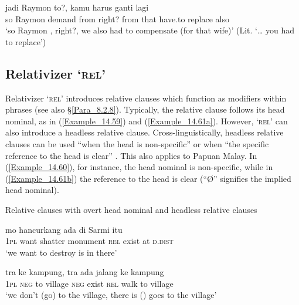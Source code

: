 \ea
\label{Example_14.58}
\gll jadi  Raymon        to?,       kamu  harus  ganti  lagi\\  
so  Raymon  demand  from    right?  from   that    have.to  replace  also\\
 ‘so Raymon , right?,  we also had to compensate (for that wife)’ (Lit. ‘{\ldots}  you had to replace’) \textstyleExampleSource{[081006-024-CvEx.0019]}
\z


\subsection{Relativizer  ‘\textsc{rel}’}
\label{Para_14.3.2}
Relativizer  ‘\textsc{rel}’ introduces relative clauses which function as modifiers within  phrases (see also §\ref{Para_8.2.8}). Typically, the relative clause follows its head nominal, as in (\ref{Example_14.59}) and (\ref{Example_14.61a}). However,  ‘\textsc{rel}’ can also introduce a headless relative clause. Cross-linguistically, headless relative clauses can be used “when the head  is non-specific” or when “the specific reference to the head is clear” \citep[295]{Payne.1997}. This also applies to Papuan Malay. In (\ref{Example_14.60}), for instance, the head nominal is non-specific, while in (\ref{Example_14.61b}) the reference to the head is clear (“Ø” signifies the implied head nominal).

\begin{styleExampleTitle}
Relative clauses with overt head nominal and headless relative clauses
\end{styleExampleTitle}
\ea\label{Example_14.59}
 {mo} {hancurkang} {} {} {ada} {di} {Sarmi} {itu}\\ %
 \textsc{1pl}  want  shatter  monument  \textsc{rel}  exist  at    \textsc{d.dist}\\
\glt ‘we want to destroy  is in  there’ \textstyleExampleSource{[080917-008-NP.0043]}
\z

\ea\label{Example_14.60}
 {tra} {ke} {kampung,} {tra} {ada} {} {} {jalang} {ke} {kampung}\\ %
 \textsc{1pl}  \textsc{neg}  to  village  \textsc{neg}  exist  {}  \textsc{rel}  walk  to  village\\
\glt ‘we don’t (go) to the village, there is ()  goes to the village’ \textstyleExampleSource{[080917-003a-CvEx.0048]}
\z

